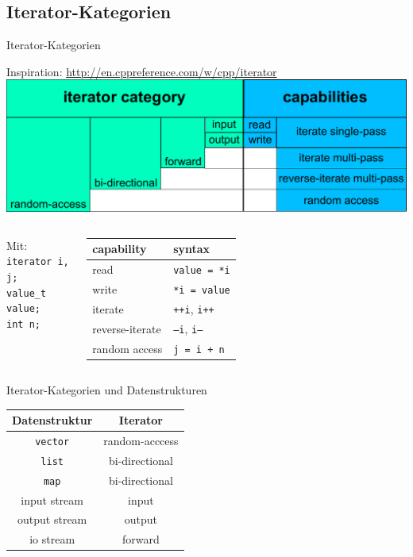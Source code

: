 \subsection{Iterator-Kategorien}

\begin{frame}{Iterator-Kategorien}
	\footnotesize
	
	Inspiration: \url{http://en.cppreference.com/w/cpp/iterator}
	\vspace{0.5em}
	\includegraphics[width=\textwidth]{images/iterator-categories}
	
	\vspace{0.5em}
	\pause
	
	\begin{columns}
		\hspace{13em}
			Mit:\\
			\texttt{iterator i, j;}	\\
			\texttt{value\_t value;}	\\
			\texttt{int n;}	\\
			
			\begin{tabular}{l|l}
				\textbf{capability}	&	\textbf{syntax}	\\
				\hline
				read	&	\texttt{value = *i}	\\
				write	&	\texttt{*i = value}	\\
				iterate	&	\texttt{++i}, \texttt{i++}	\\
				reverse-iterate	&	\texttt{--i}, \texttt{i--}	\\
				random access &	\texttt{j = i + n}	\\
			\end{tabular}
	\end{columns}
\end{frame}

\begin{frame}{Iterator-Kategorien und Datenstrukturen}
	\begin{center}
		\begin{tabular}{c|c}
			\textbf{Datenstruktur}	&	\textbf{Iterator}	\\
			\hline
			\texttt{vector}	&	random-acccess	\\
			\texttt{list}	&	bi-directional	\\
			\texttt{map}	&	bi-directional	\\
			input stream	&	input	\\
			output stream	&	output	\\
			io stream		&	forward	\\
		\end{tabular}
	\end{center}
\end{frame}


